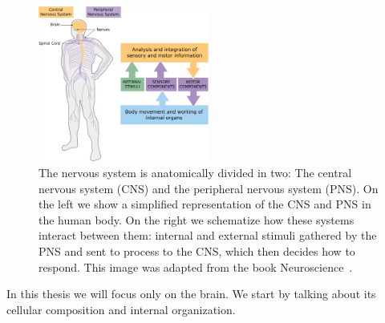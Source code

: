 \begin{figure}[h]
    \includegraphics[width=0.5\textwidth]{2.neuroanatomy/img/pns_and_cns.png}
    \caption{The nervous system is anatomically divided in two: The central
             nervous system (CNS) and the peripheral nervous system (PNS).
             On the left we show a simplified representation of the CNS and
             PNS in the human body. On the right we schematize how these systems
             interact between them: internal and external stimuli gathered by
             the PNS and sent to process to the CNS, which then decides how to
             respond. This image was adapted from the book Neuroscience~\cite{Purves2004}.}
    \label{fig:cns_and_pns}
\end{figure}  

In this thesis we will focus only on the brain. We start by talking about its
cellular composition and internal organization.

